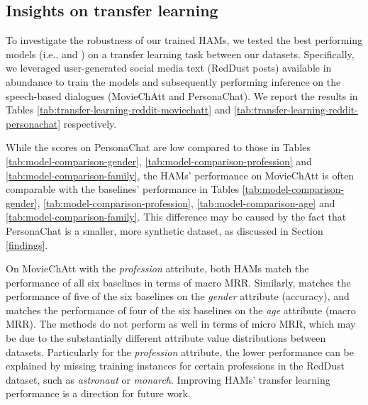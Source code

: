 \vspace{-5pt}
\subsection{Insights on transfer learning}

To investigate the robustness of our trained HAMs,
we tested the best performing models (i.e.,  and )
on a transfer learning task between our datasets. 
Specifically, we leveraged user-generated social media text (RedDust posts) available in abundance to train the models and subsequently performing inference on the speech-based dialogues (MovieChAtt and PersonaChat). 
We report the results in Tables \ref{tab:transfer-learning-reddit-moviechatt} and \ref{tab:transfer-learning-reddit-personachat} respectively.

While the scores on PersonaChat are low compared to those in Tables \ref{tab:model-comparison-gender}, \ref{tab:model-comparison-profession} and \ref{tab:model-comparison-family}, the HAMs' performance on MovieChAtt is often comparable with the baselines' performance in Tables \ref{tab:model-comparison-gender}, \ref{tab:model-comparison-profession}, \ref{tab:model-comparison-age} and \ref{tab:model-comparison-family}.
This difference may be caused by the fact that PersonaChat is a smaller, more synthetic dataset, as discussed in Section \ref{findings}.

On MovieChAtt with the \textit{profession} attribute, both HAMs match the performance of all six baselines in terms of macro MRR. Similarly,  matches the performance of five of the six baselines on the \textit{gender} attribute (accuracy), and  matches the performance of four of the six baselines on the \textit{age} attribute (macro MRR). The methods do not perform as well in terms of micro MRR, which may be due to the substantially different attribute value distributions between datasets.
Particularly for the \textit{profession} attribute, the lower performance can be explained by missing training instances  for certain professions in the RedDust dataset, such as \textit{astronaut} or \textit{monarch}. 
Improving HAMs' transfer learning performance is a direction for future work.



